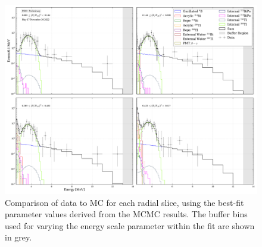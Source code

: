 \begin{figure}
    \centering
    \includegraphics[width=\textwidth]{6_SolarAnalysis/images/data_mc_fit_plot_1D_energy_r3_slices_log_maxlh.pdf}
    \caption[Comparison of data to MC for each radial slice]
    {Comparison of data to MC for each radial slice, using the best-fit parameter values derived from the MCMC results. The buffer bins used for varying the energy scale parameter within the fit are shown in grey.}
    \label{fig:solar_data_mc_slices_comparison}
\end{figure}


